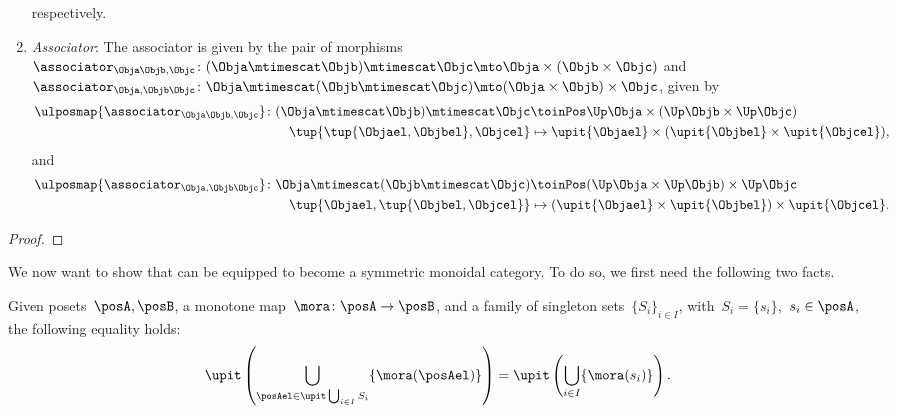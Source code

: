 \begin{lemma}
\begin{enumerate}
    respectively.
    \item \emph{Associator}: The associator is given by the pair of morphisms~$\associator_{\Obja\Objb,\Objc}\colon (\Obja\mtimescat \Objb)\mtimescat \Objc \mto \Obja\times ( \Objb \times \Objc)$ and~$\associator_{\Obja,\Objb\Objc}\colon \Obja\mtimescat (\Objb\mtimescat \Objc) \mto (\Obja\times \Objb) \times \Objc$, given by
    \begin{equation}
        \begin{aligned}
            \ulposmap{\associator_{\Obja\Objb,\Objc}}\colon (\Obja\mtimescat \Objb)\mtimescat \Objc &\toinPos \Up \Obja\times (\Up \Objb \times \Up \Objc)\\
            \tup{\tup{\Objael,\Objbel},\Objcel}&\mapsto \upit\{\Objael\}\times (\upit\{\Objbel\}\times \upit\{\Objcel\}),
        \end{aligned}
    \end{equation}
    and
    \begin{equation}
        \begin{aligned}
            \ulposmap{\associator_{\Obja,\Objb\Objc}}\colon \Obja\mtimescat (\Objb\mtimescat \Objc) &\toinPos (\Up \Obja\times \Up \Objb) \times \Up \Objc\\
            \tup{\Objael,\tup{\Objbel,\Objcel}}&\mapsto (\upit\{\Objael\}\times \upit\{\Objbel\})\times \upit\{\Objcel\}.
        \end{aligned}
    \end{equation}
\end{enumerate}
\end{lemma}
\begin{proof}
\end{proof}


We now want to show that \UPos can be equipped to become a symmetric monoidal category.
To do so, we first need the following two facts.

\begin{lemma}
  \label{lem:unpack_u_functor}
  Given posets~$\posA,\posB$, a monotone map~$\mora \colon \posA \to \posB$, and a family of singleton sets~$\{S_i\}_{i\in I}$, with~$S_i=\{s_i\}$,~$s_i\in \posA$, the following equality holds:
  \begin{equation}
    \label{eq:lemma_unpack}
    \upit \left( \bigcup_{\posAel \in \upit \bigcup_{i\in I}S_i}\{\mora(\posAel)\}\right)= \upit \left( \bigcup_{i\in I} \{\mora(s_i)\}\right).
  \end{equation}
\end{lemma}

